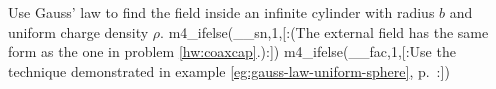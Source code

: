 Use Gauss' law to find the field inside an
        infinite cylinder with radius $b$ and uniform
        charge density $\rho$. 
m4_ifelse(__sn,1,[:(The external field has the same form as
        the one in problem \ref{hw:coaxcap}.):])%
m4_ifelse(__fac,1,[:Use the technique demonstrated in example \ref{eg:gauss-law-uniform-sphere},
        p.~\pageref{eg:gauss-law-uniform-sphere}:])%
\answercheck
